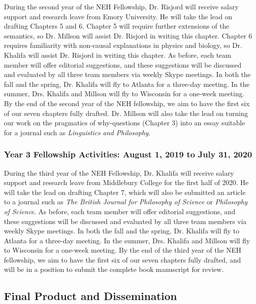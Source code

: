 \documentclass{article}[11pt]
\begin{document}
During the second year of the NEH Fellowship, Dr. Risjord will receive salary support and research leave from Emory University.  He will take the lead on drafting Chapters 5 and 6. Chapter 5 will require further 
extensions of the semantics, so Dr. Millson will assist Dr. Risjord in writing this chapter. Chapter 6 requires familiarity with non-causal explanations in physics and biology, so Dr. Khalifa will assist Dr. Risjord in writing this chapter. As before, each team member will offer editorial suggestions, and these suggestions will be discussed and evaluated by all three team members via weekly Skype meetings. In both the fall and the spring, Dr. Khalifa will fly to Atlanta for a three-day meeting. In the summer, Drs. Khalifa and Millson will fly to Wisconsin for a one-week meeting. By the end of the second year of the NEH fellowship, we aim to have the first six of our seven chapters fully drafted. Dr. Millson will also take the lead on turning our work on the pragmatics of why-questions (Chapter 3) into an essay suitable for a  journal such as \textit{Linguistics and Philosophy}.

\subsubsection*{Year 3 Fellowship Activities: August 1, 2019 to July 31, 2020}
During the third year of the NEH Fellowship, Dr. Khalifa will receive salary support and research leave from Middlebury College for the first half of 2020.  He will take the lead on drafting Chapter 7, which will also be submitted an article to a journal such as \textit{The British Journal for Philosophy of Science} or \textit{Philosophy of Science}. As before, each team member will offer editorial suggestions, and these suggestions will be discussed and evaluated by all three team members via weekly Skype meetings. In both the fall and the spring, Dr. Khalifa will fly to Atlanta for a three-day meeting. In the summer, Drs. Khalifa and Millson will fly to Wisconsin for a one-week meeting. By the end of the third year of the NEH fellowship, we aim to have the first six of our seven chapters fully drafted, and will be in a position to submit the complete book manuscript for review.


\subsection{Final Product and Dissemination}
\end{document}
